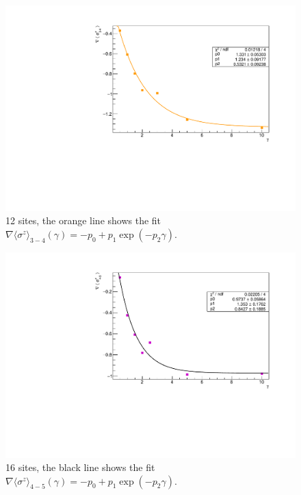 \begin{figure}[H]
    \centering
    \includegraphics[scale=0.7]{Figures/12sites/FIT_12sites_gradLM34VSgamma.pdf}
    \caption{12 sites, the orange line shows the fit \\$\nabla \langle\sigma^z\rangle_{3-4}(\gamma) = -p_0+p_1\exp{(-p_2\gamma)}$.}
    \label{fig:FIT_12sites_gradLM34VSgamma}
\end{figure}

\begin{figure}[H]
    \centering
    \includegraphics[scale=0.7]{Figures/16sites/FIT_16sites_gradLM45VSgamma.pdf}
    \caption{16 sites, the black line shows the fit \\$\nabla \langle\sigma^z\rangle_{4-5}(\gamma) = -p_0+p_1\exp{(-p_2\gamma)}$.}
    \label{fig:FIT_16sites_gradLM45VSgamma}
\end{figure}

